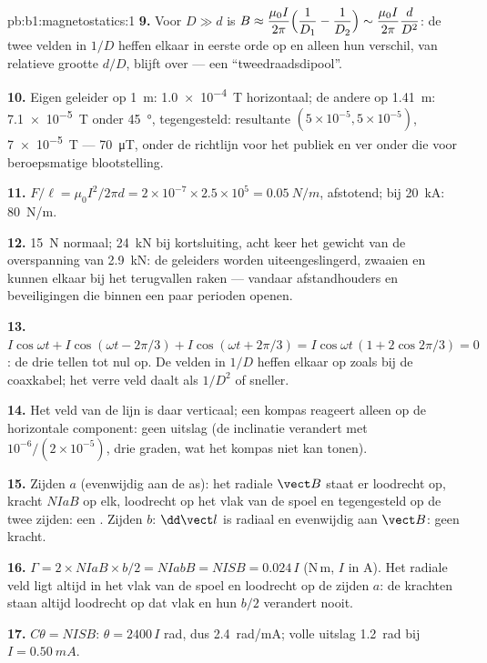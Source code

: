 \begin{solution}{pb:b1:magnetostatics:1}
\textbf{9.} Voor $D \gg d$ is $B \approx \dfrac{\mu_0I}{2\pi}\Bigl(\dfrac1{D_1} - \dfrac1{D_2}\Bigr)
\sim \dfrac{\mu_0I}{2\pi}\dfrac{d}{D^2}$: de twee velden in $1/D$ heffen elkaar in eerste
orde op en alleen hun verschil, van relatieve grootte $d/D$, blijft over --- een
``tweedraadsdipool''.

\textbf{10.} Eigen geleider op \qty{1}{m}: \qty{1.0e-4}{T} horizontaal; de andere
op \qty{1.41}{m}: \qty{7.1e-5}{T} onder \qty{45}{\degree}, tegengesteld: resultante
$(5 \times 10^{-5}, 5 \times 10^{-5})$, \qty{7e-5}{T} --- \qty{70}{\micro T}, onder de
richtlijn voor het publiek en ver onder die voor beroepsmatige blootstelling.

\textbf{11.} $F/\ell = \mu_0I^2/2\pi d = 2 \times 10^{-7} \times 2.5 \times 10^5 =
\qty{0.05}{N/m}$, afstotend; bij \qty{20}{kA}: \qty{80}{N/m}.

\textbf{12.} \qty{15}{N} normaal; \qty{24}{kN} bij kortsluiting, acht keer
het gewicht van de overspanning van \qty{2.9}{kN}: de geleiders worden uiteengeslingerd, zwaaien
en kunnen elkaar bij het terugvallen raken --- vandaar afstandhouders en beveiligingen die
binnen een paar perioden openen.

\textbf{13.} $I\cos\omega t + I\cos(\omega t - 2\pi/3) + I\cos(\omega t + 2\pi/3) =
I\cos\omega t\,(1 + 2\cos2\pi/3) = 0$: de drie  tellen tot nul op. De
velden in $1/D$ heffen elkaar op zoals bij de coaxkabel; het verre veld daalt als $1/D^2$ of
sneller.

\textbf{14.} Het veld van de lijn is daar verticaal; een kompas reageert alleen op
de horizontale component: geen uitslag (de inclinatie verandert met
$10^{-6}/(2 \times 10^{-5})$, drie graden, wat het kompas niet kan tonen).

\textbf{15.} Zijden $a$ (evenwijdig aan de as): het radiale $\vect B$ staat er
loodrecht op, kracht $NIaB$ op elk, loodrecht op het
vlak van de spoel en tegengesteld op de twee zijden: een . Zijden $b$: $\dd\vect l$
is radiaal en evenwijdig aan $\vect B$: geen kracht.

\textbf{16.} $\Gamma = 2 \times NIaB \times b/2 = NIabB = NISB = 0.024\,I$ (N\,m, $I$
in A). Het radiale veld ligt altijd in het vlak van de spoel en loodrecht
op de zijden $a$: de krachten staan altijd loodrecht op dat vlak en hun
 $b/2$ verandert nooit.

\textbf{17.} $C\theta = NISB$: $\theta = 2400\,I$ rad, dus \qty{2.4}{rad/mA}; volle
uitslag \qty{1.2}{rad} bij $I = \qty{0.50}{mA}$.


\end{solution}

